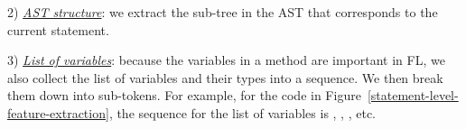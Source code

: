 2) {\em \underline{AST structure}}: we extract the sub-tree in the AST that
corresponds to the current statement.

3) {\em \underline{List of variables}}: because the variables in a
method are important in FL, we also collect the list of variables and
their types into a sequence. We then break them down into
sub-tokens. For example, for the code in
Figure~\ref{statement-level-feature-extraction}, the sequence for the
list of variables is , ,
, etc.





